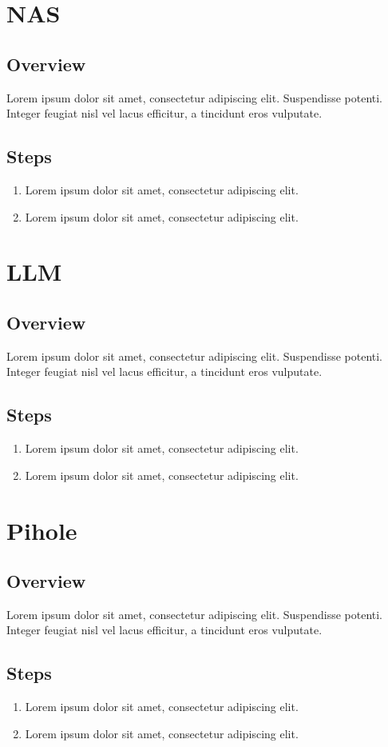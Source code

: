\documentclass[a4paper,12pt]{article}
\begin{document}
\section{NAS}

\subsection{Overview}
Lorem ipsum dolor sit amet, consectetur adipiscing elit. Suspendisse potenti. Integer feugiat nisl vel lacus efficitur, a tincidunt eros vulputate.

\subsection{Steps}
\begin{enumerate}
    \item Lorem ipsum dolor sit amet, consectetur adipiscing elit.
    \item Lorem ipsum dolor sit amet, consectetur adipiscing elit.
\end{enumerate}

\section{LLM}

\subsection{Overview}
Lorem ipsum dolor sit amet, consectetur adipiscing elit. Suspendisse potenti. Integer feugiat nisl vel lacus efficitur, a tincidunt eros vulputate.

\subsection{Steps}
\begin{enumerate}
    \item Lorem ipsum dolor sit amet, consectetur adipiscing elit.
    \item Lorem ipsum dolor sit amet, consectetur adipiscing elit.
\end{enumerate}

\section{Pihole}

\subsection{Overview}
Lorem ipsum dolor sit amet, consectetur adipiscing elit. Suspendisse potenti. Integer feugiat nisl vel lacus efficitur, a tincidunt eros vulputate.

\subsection{Steps}
\begin{enumerate}
    \item Lorem ipsum dolor sit amet, consectetur adipiscing elit.
    \item Lorem ipsum dolor sit amet, consectetur adipiscing elit.
\end{enumerate}
\end{document}
